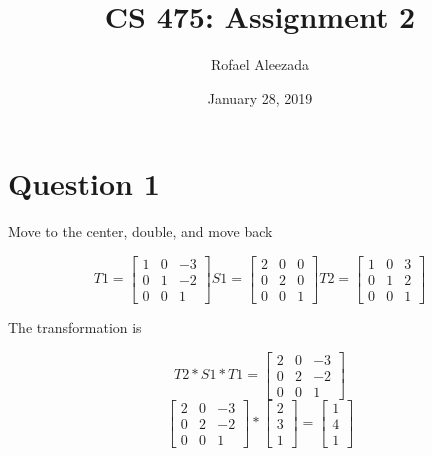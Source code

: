 \documentclass{article}
\title{CS 475: Assignment 2}
\date{January 28, 2019}
\author{Rofael Aleezada}
\begin{document}
	\maketitle
	
	\section{Question 1}
		\begin{center}
			Move to the center, double, and move back
		\end{center}
		\[
			T1 = 
			\begin{bmatrix}
				1 & 0 & -3 \\
				0 & 1 & -2 \\
				0 & 0 & 1
			\end{bmatrix}
			S1 = 
			\begin{bmatrix}
			2 & 0 & 0 \\
			0 & 2 & 0 \\
			0 & 0 & 1
			\end{bmatrix}
			T2 = 
			\begin{bmatrix}
			1 & 0 & 3 \\
			0 & 1 & 2 \\
			0 & 0 & 1
			\end{bmatrix}
		\]
		\begin{center}
		The transformation is 
		\end{center}
		\[
			T2 * S1 * T1 = 
			 \begin{bmatrix}
			 2 & 0 & -3 \\
			 0 & 2 & -2 \\
			 0 & 0 & 1
			 \end{bmatrix}
		\]
		\[
			\begin{bmatrix}
			2 & 0 & -3 \\
			0 & 2 & -2 \\
			0 & 0 & 1
			\end{bmatrix}
			*
			\begin{bmatrix}
			2 \\ 
			3 \\
			1 
			\end{bmatrix}
			=
			\begin{bmatrix}
			1 \\
			4 \\ 
			1 
			\end{bmatrix}
		\]
	
\end{document}

